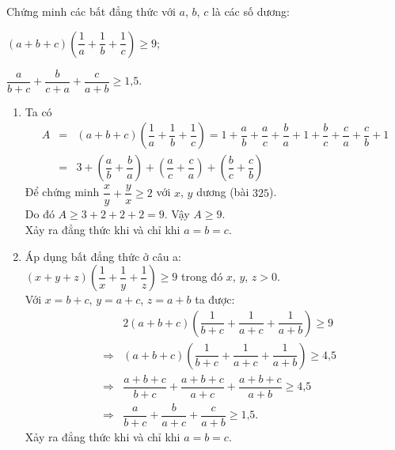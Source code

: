 \begin{vd}%
	Chứng minh các bất đẳng thức với $a$, $b$, $c$ là các số dương:
	\begin{enumEX}{2}
		\item $\left(a+b+c\right)\left(\dfrac{1}{a}+\dfrac{1}{b}+\dfrac{1}{c}\right)\geq 9$;
		\item $\dfrac{a}{b+c}+\dfrac{b}{c+a}+\dfrac{c}{a+b}\geq 1\text{,}5$.
	\end{enumEX}
	\loigiai
	{
	\begin{enumerate}
		\item Ta có 
		\begin{eqnarray*}
			A&=&\left(a+b+c\right)\left(\dfrac{1}{a}+\dfrac{1}{b}+\dfrac{1}{c}\right)=1+\dfrac{a}{b}+\dfrac{a}{c}+\dfrac{b}{a}+1+\dfrac{b}{c}+\dfrac{c}{a}+\dfrac{c}{b}+1\\
			&=&3+\left(\dfrac{a}{b}+\dfrac{b}{a}\right)+\left(\dfrac{a}{c}+\dfrac{c}{a}\right)+\left(\dfrac{b}{c}+\dfrac{c}{b}\right)
		\end{eqnarray*}
	Để chứng minh $\dfrac{x}{y}+\dfrac{y}{x}\geq 2$ với $x$, $y$ dương (bài $325$).\\
	Do đó $A\geq 3+2+2+2=9$. Vậy $A\geq 9$.\\
	Xảy ra đẳng thức khi và chỉ khi $a=b=c$.
	\item Áp dụng bất đẳng thức ở câu a:\\
	\hspace{2cm}$\left(x+y+z\right)\left(\dfrac{1}{x}+\dfrac{1}{y}+\dfrac{1}{z}\right)\geq 9$ trong đó $x$, $y$, $z>0$.\\
	Với $x=b+c$, $y=a+c$, $z=a+b$ ta được:
	\begin{eqnarray*}
		&&2\left(a+b+c\right)\left(\dfrac{1}{b+c}+\dfrac{1}{a+c}+\dfrac{1}{a+b}\right)\geq 9\\
		&\Rightarrow& \left(a+b+c\right)\left(\dfrac{1}{b+c}+\dfrac{1}{a+c}+\dfrac{1}{a+b}\right)\geq 4\text{,}5\\
		&\Rightarrow& \dfrac{a+b+c}{b+c}+\dfrac{a+b+c}{a+c}+\dfrac{a+b+c}{a+b}\geq 4\text{,}5\\
		&\Rightarrow& \dfrac{a}{b+c}+\dfrac{b}{a+c}+\dfrac{c}{a+b}\geq 1\text{,}5.
	\end{eqnarray*}
	Xảy ra đẳng thức khi và chỉ khi $a=b=c$.
	\end{enumerate}
	}
\end{vd}
